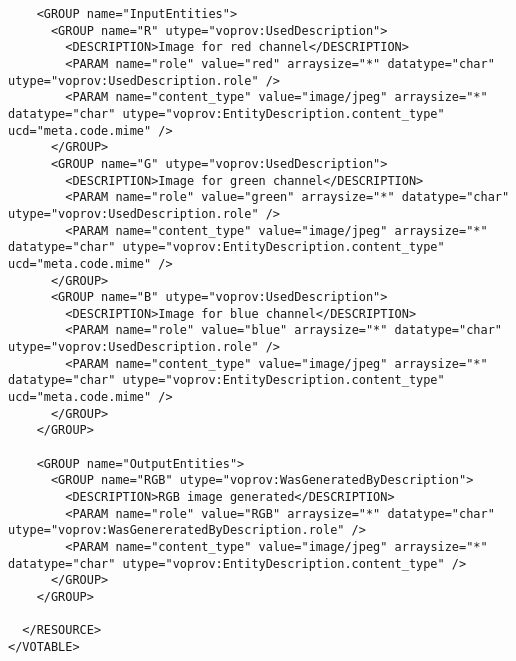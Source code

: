 \begin{verbatim}
    <GROUP name="InputEntities">
      <GROUP name="R" utype="voprov:UsedDescription">
        <DESCRIPTION>Image for red channel</DESCRIPTION>
        <PARAM name="role" value="red" arraysize="*" datatype="char" utype="voprov:UsedDescription.role" />
        <PARAM name="content_type" value="image/jpeg" arraysize="*" datatype="char" utype="voprov:EntityDescription.content_type" ucd="meta.code.mime" />
      </GROUP>
      <GROUP name="G" utype="voprov:UsedDescription">
        <DESCRIPTION>Image for green channel</DESCRIPTION>
        <PARAM name="role" value="green" arraysize="*" datatype="char" utype="voprov:UsedDescription.role" />
        <PARAM name="content_type" value="image/jpeg" arraysize="*" datatype="char" utype="voprov:EntityDescription.content_type" ucd="meta.code.mime" />
      </GROUP>
      <GROUP name="B" utype="voprov:UsedDescription">
        <DESCRIPTION>Image for blue channel</DESCRIPTION>
        <PARAM name="role" value="blue" arraysize="*" datatype="char" utype="voprov:UsedDescription.role" />
        <PARAM name="content_type" value="image/jpeg" arraysize="*" datatype="char" utype="voprov:EntityDescription.content_type" ucd="meta.code.mime" />
      </GROUP>
    </GROUP>
    
    <GROUP name="OutputEntities">
      <GROUP name="RGB" utype="voprov:WasGeneratedByDescription">
        <DESCRIPTION>RGB image generated</DESCRIPTION>
        <PARAM name="role" value="RGB" arraysize="*" datatype="char" utype="voprov:WasGenereratedByDescription.role" />
        <PARAM name="content_type" value="image/jpeg" arraysize="*" datatype="char" utype="voprov:EntityDescription.content_type" />
      </GROUP>
    </GROUP>
    
  </RESOURCE>
</VOTABLE>
\end{verbatim}
